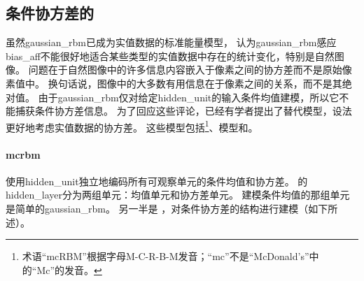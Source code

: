\subsection{条件协方差的}
\label{sec:undirected_models_of_conditional_covariance}

虽然\gls{gaussian_rbm}已成为实值数据的标准能量模型， \citet{Ranzato2010a}认为\gls{gaussian_rbm}感应\gls{bias_aff}不能很好地适合某些类型的实值数据中存在的统计变化，特别是自然图像。
问题在于自然图像中的许多信息内容嵌入于像素之间的协方差而不是原始像素值中。
换句话说，图像中的大多数有用信息在于像素之间的关系，而不是其绝对值。
由于\gls{gaussian_rbm}仅对给定\gls{hidden_unit}的输入条件均值建模，所以它不能捕获条件协方差信息。
为了回应这些评论，已经有学者提出了替代模型，设法更好地考虑实值数据的协方差。
这些模型包括\footnote{术语``mcRBM''根据字母M-C-R-B-M发音；``mc''不是``McDonald's''中的``Mc''的发音。}、模型和。


\paragraph{\gls{mcrbm}} 使用\gls{hidden_unit}独立地编码所有可观察单元的条件均值和协方差。
的\gls{hidden_layer}分为两组单元：均值单元和协方差单元。
建模条件均值的那组单元是简单的\gls{gaussian_rbm}。
另一半是 \citep{Ranzato2010a}，对条件协方差的结构进行建模（如下所述）。


